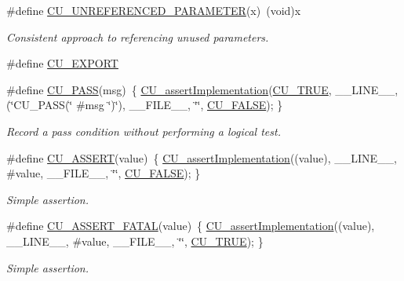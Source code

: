 \begin{DoxyCompactItemize}
\#define \hyperlink{group___framework_ga4dba71bf5d76673e1b074074208fe081}{C\+U\+\_\+\+U\+N\+R\+E\+F\+E\+R\+E\+N\+C\+E\+D\+\_\+\+P\+A\+R\+A\+M\+E\+T\+E\+R}(x)~(void)x
\begin{DoxyCompactList}\small\item\em Consistent approach to referencing unused parameters. \end{DoxyCompactList}\item 
\#define \hyperlink{group___framework_ga22e538403fdee24be3388ab473fe64d5}{C\+U\+\_\+\+E\+X\+P\+O\+R\+T}
\item 
\#define \hyperlink{group___framework_ga2366d0e38023a3c89683efee6ebb5696}{C\+U\+\_\+\+P\+A\+S\+S}(msg)~\{ \hyperlink{group___framework_gad409fc536d9d3fb5f659c76421e8ce3b}{C\+U\+\_\+assert\+Implementation}(\hyperlink{group___framework_ga99641394bc766ca9c4a295e942fed1ef}{C\+U\+\_\+\+T\+R\+U\+E}, \+\_\+\+\_\+\+L\+I\+N\+E\+\_\+\+\_\+, (\char`\"{}C\+U\+\_\+\+P\+A\+S\+S(\char`\"{} \#msg \char`\"{})\char`\"{}), \+\_\+\+\_\+\+F\+I\+L\+E\+\_\+\+\_\+, \char`\"{}\char`\"{}, \hyperlink{group___framework_ga7453214541b156ef868681eaafe60860}{C\+U\+\_\+\+F\+A\+L\+S\+E}); \}
\begin{DoxyCompactList}\small\item\em Record a pass condition without performing a logical test. \end{DoxyCompactList}\item 
\#define \hyperlink{group___framework_ga6e7994f2558c2acf0896cab24f9d9922}{C\+U\+\_\+\+A\+S\+S\+E\+R\+T}(value)~\{ \hyperlink{group___framework_gad409fc536d9d3fb5f659c76421e8ce3b}{C\+U\+\_\+assert\+Implementation}((value), \+\_\+\+\_\+\+L\+I\+N\+E\+\_\+\+\_\+, \#value, \+\_\+\+\_\+\+F\+I\+L\+E\+\_\+\+\_\+, \char`\"{}\char`\"{}, \hyperlink{group___framework_ga7453214541b156ef868681eaafe60860}{C\+U\+\_\+\+F\+A\+L\+S\+E}); \}
\begin{DoxyCompactList}\small\item\em Simple assertion. \end{DoxyCompactList}\item 
\#define \hyperlink{group___framework_ga09431caea46ba334835083160f1e758b}{C\+U\+\_\+\+A\+S\+S\+E\+R\+T\+\_\+\+F\+A\+T\+A\+L}(value)~\{ \hyperlink{group___framework_gad409fc536d9d3fb5f659c76421e8ce3b}{C\+U\+\_\+assert\+Implementation}((value), \+\_\+\+\_\+\+L\+I\+N\+E\+\_\+\+\_\+, \#value, \+\_\+\+\_\+\+F\+I\+L\+E\+\_\+\+\_\+, \char`\"{}\char`\"{}, \hyperlink{group___framework_ga99641394bc766ca9c4a295e942fed1ef}{C\+U\+\_\+\+T\+R\+U\+E}); \}
\begin{DoxyCompactList}\small\item\em Simple assertion. \end{DoxyCompactList}\item 

\end{DoxyCompactItemize}
